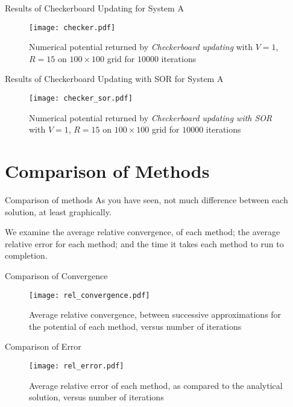 \documentclass{beamer}
\begin{document}
\begin{frame}{Results of Checkerboard Updating for System A}
\begin{figure}
\begin{center}
\texttt{[image: checker.pdf]}
\caption{Numerical potential returned by \emph{Checkerboard updating} with $V=1$, $R=15$
on $100\times100$ grid for $10000$ iterations}
\end{center}
\end{figure}

\end{frame}

\begin{frame}{Results of Checkerboard Updating with SOR for System A}
\begin{figure}
\begin{center}
\texttt{[image: checker\_sor.pdf]}
\caption{Numerical potential returned by \emph{Checkerboard updating with SOR} with
$V=1$, $R=15$ on $100\times100$ grid for $10000$ iterations}
\end{center}
\end{figure}

\end{frame}

\section{Comparison of Methods}
\begin{frame}{Comparison of methods}
As you have seen, not much difference between each solution, at least graphically.

We examine the average relative convergence, of each method; the average relative
error for each method; and the time it takes each method to run to completion.
\end{frame}

\begin{frame}{Comparison of Convergence}
\begin{figure}
\centering
\texttt{[image: rel\_convergence.pdf]}
\caption{Average relative convergence, between successive approximations for the
potential of each method, versus number of iterations}
\end{figure}

\end{frame}

\begin{frame}{Comparison of Error}
\begin{figure}
\centering
\texttt{[image: rel\_error.pdf]}
\caption{Average relative error of each method, as compared to the analytical solution,
versus number of iterations}
\end{figure}

\end{frame}
\end{document}
